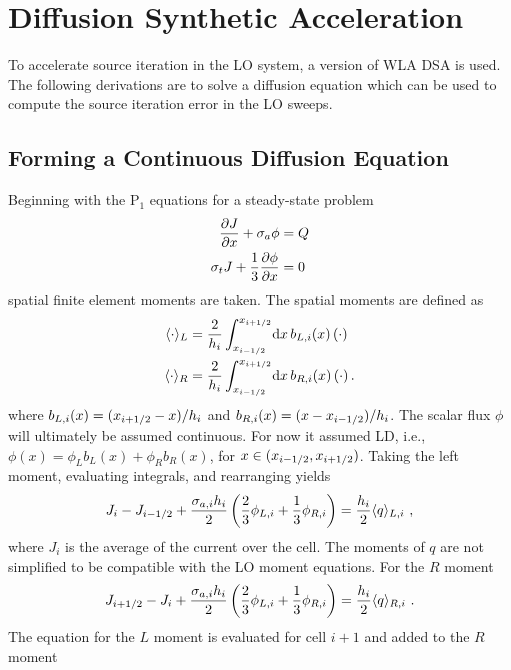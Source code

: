 \section{Diffusion Synthetic Acceleration}

To accelerate source iteration in the LO system, a version of WLA DSA is used.  The
following derivations are to solve a diffusion equation which can be used to compute
the source iteration error in the LO sweeps.

\subsection{Forming a Continuous Diffusion Equation}

Beginning with the P$_1$ equations for a steady-state problem
\begin{align}\label{eq:dsa_bal}
    \frac{\partial J}{\partial x} + \sigma_a \phi &= Q \\ \label{eq:p1}
    \sigma_t J + \frac{1}{3} \frac{\partial \phi}{\partial x} &= 0 \\
\end{align}
spatial finite element moments are taken. The spatial moments are defined as
\begin{align}
    \langle \cdot \rangle_L &= \frac{2}{h_i} \int_{{x_{i-1/2}}}^{{x_{i+1/2}}} \! \mathrm{d} x \,b_{L,i}(x)    \left( \cdot \right) \\
    \langle \cdot \rangle_R &= \frac{2}{h_i} \int_{{x_{i-1/2}}}^{{x_{i+1/2}}} \! \mathrm{d} x \,b_{R,i}(x) \left( \cdot \right).
\end{align}
where $b_{L,i}(x) = ({x_{i+1/2}} - x)/h_i$ and $b_{R,i}(x) = (x - {x_{i-1/2}})/h_i$.
The scalar flux $\phi$ will ultimately be assumed continuous.  For now it assumed LD, i.e.,
$\phi(x)=\phi_Lb_L(x) + \phi_Rb_R(x)$, for $x\in({x_{i-1/2}},{x_{i+1/2}})$.   Taking the left moment,
evaluating integrals, and rearranging yields
\begin{equation}
    J_{i} - J_{{i-1/2}}  + \frac{\sigma_{a,i}h_i}{2} \left(\frac{2}{3} \phi_{L,i} + \frac{1}{3}
    \phi_{R,i} \right) = \frac{h_i}{2} \langle q \rangle_{L,i}\,\,,
\end{equation}
where $J_i$ is the average of the current over the cell. The moments of $q$ are
not simplified to be compatible with the LO moment equations. For the $R$ moment
\begin{equation}
    J_{i+1/2} - J_{i}  + \frac{\sigma_{a,i}h_i}{2} \left(\frac{2}{3} \phi_{L,i} + \frac{1}{3}
    \phi_{R,i} \right) = \frac{h_i}{2} \langle q \rangle_{R,i}\,\,.
\end{equation}
The equation for the $L$ moment is evaluated for cell $i+1$ and added to the $R$ moment
